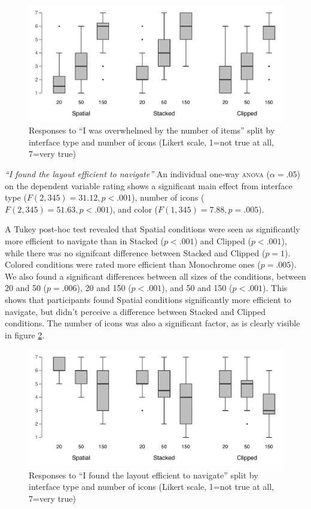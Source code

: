 \documentclass[nobib]{tufte-book} %
\begin{document}
\begin{figure}
\includegraphics{postcon-overwhelmed.pdf}
\caption{Responses to ``I was overwhelmed by the number of items'' split by interface type and number of icons (Likert scale, 1=not true at all, 7=very true)}
\label{fig:overwhelmed}
\end{figure}

\emph{``I found the layout efficient to navigate''}
An individual one-way \textsc{anova} ($\alpha = .05$) on the dependent variable rating shows a significant main effect from interface type ($F(2,345) = 31.12, p < .001$), number of icons ($F(2,345) = 51.63, p < .001$), and color ($F(1,345) = 7.88, p = .005$).

A Tukey post-hoc test revealed that Spatial conditions were seen as significantly more efficient to navigate than in Stacked ($p < .001$) and Clipped ($p < .001$), while there was no signifcant difference between Stacked and Clipped ($p = 1$). Colored conditions were rated more efficient than Monochrome ones ($p = .005$). We also found a significant differences between all sizes of the conditions, between 20 and 50 ($p = .006$), 20 and 150 ($p < .001$), and 50 and 150 ($p < .001$). This shows that participants found Spatial conditions significantly more efficient to navigate, but didn't perceive a difference between Stacked and Clipped conditions. The number of icons was also a significant factor, as is clearly visible in figure \ref{fig:efficient}.

\begin{figure}
\includegraphics{postcon-efficient.pdf}
\caption{Responses to ``I found the layout efficient to navigate'' split by interface type and number of icons (Likert scale, 1=not true at all, 7=very true)}
\label{fig:efficient}
\end{figure}
\end{document}
